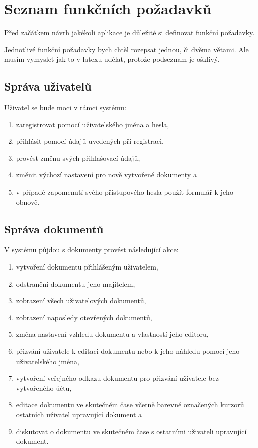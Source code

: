 
\section{Seznam funkčních požadavků}\label{sec:funcniPozadavky}
Před začátkem návrh jakékoli aplikace je důležité si definovat funkční požadavky.

Jednotlivé funkční požadavky bych chtěl rozepsat jednou, či dvěma větami.
Ale musím vymyslet jak to v latexu udělat, protože podseznam je ošklivý.

\subsection{Správa uživatelů}\label{subsec:správaUživatelů}

Uživatel se bude moci v rámci systému:
\begin{enumerate}[label=F1.\arabic*.]
    \item zaregistrovat pomocí uživatelského jména a hesla,
    \item přihlásit pomocí údajů uvedených při registraci,
    \item provést změnu svých přihlašovací údajů,
    \item změnit výchozí nastavení pro nově vytvořené dokumenty a
    \item v případě zapomenutí svého přístupového hesla použít formulář k jeho obnově.
\end{enumerate}

\subsection{Správa dokumentů}\label{subsec:správaDokumentů}

V systému půjdou s dokumenty provést následující akce:
\begin{enumerate}[label=F2.\arabic*.]
    \item vytvoření dokumentu přihlášeným uživatelem,
    \item odstranění dokumentu jeho majitelem,
    \item zobrazení všech uživatelových dokumentů,
    \item zobrazení naposledy otevřených dokumentů,
    \item změna nastavení vzhledu dokumentu a vlastností jeho editoru,
    \item přizvání uživatele k editaci dokumentu nebo k jeho náhledu pomocí jeho uživatelského jména,
    \item vytvoření veřejného odkazu dokumentu pro přizvání uživatele bez vytvořeného účtu,
    \item editace dokumentu ve skutečném čase včetně barevně označených kurzorů ostatních uživatel upravující dokument a
    \item diskutovat o dokumentu ve skutečném čase s ostatními uživateli upravující dokument.
\end{enumerate}

